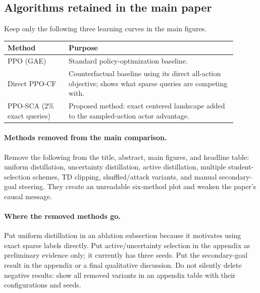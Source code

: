 \documentclass[11pt]{article}
\newcommand{\ppocf}{\textsc{PPO-CF}}
\newcommand{\pposca}{\textsc{PPO-SCA}}
\newcommand{\ppo}{\textsc{PPO}}
\begin{document}
\subsection{Algorithms retained in the main paper}
Keep only the following three learning curves in the main figures.
\begin{center}
\begin{tabular}{p{0.24\linewidth}p{0.66\linewidth}}
\toprule
\textbf{Method} & \textbf{Purpose} \\
\midrule
\ppo{} (GAE) & Standard policy-optimization baseline. \\
Direct \ppocf{} & Counterfactual baseline using its direct all-action objective;
shows what sparse queries are competing with. \\
\pposca{} (2\% exact queries) & Proposed method: exact centered landscape added to
the sampled-action actor advantage. \\
\bottomrule
\end{tabular}
\end{center}

\paragraph{Methods removed from the main comparison.}
Remove the following from the title, abstract, main figures, and headline table:
uniform distillation, uncertainty distillation, active distillation, multiple
student-selection schemes, TD clipping, shuffled/attack variants, and manual
secondary-goal steering. They create an unreadable six-method plot and weaken
the paper's causal message.

\paragraph{Where the removed methods go.}
Put uniform distillation in an ablation subsection because it motivates using
exact sparse labels directly. Put active/uncertainty selection in the appendix
as preliminary evidence only; it currently has three seeds. Put the
secondary-goal result in the appendix or a final qualitative discussion. Do not
silently delete negative results: show all removed variants in an appendix
table with their configurations and seeds.
\end{document}

